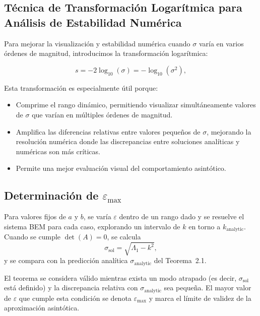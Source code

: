 \documentclass[11pt]{article}
\begin{document}
\subsection{Técnica de Transformación Logarítmica para Análisis de Estabilidad Numérica}\label{subsec:transformacion_log}

Para mejorar la visualización y estabilidad numérica cuando $\sigma$ varía en varios órdenes de magnitud, introducimos la transformación logarítmica:

\begin{equation}
s = -2 \log_{10}(\sigma) = -\log_{10}(\sigma^2),
\end{equation}

Esta transformación es especialmente útil porque:

\begin{itemize}
\item Comprime el rango dinámico, permitiendo visualizar simultáneamente valores de $\sigma$ que varían en múltiples órdenes de magnitud.

\item Amplifica las diferencias relativas entre valores pequeños de $\sigma$, mejorando la resolución numérica donde las discrepancias entre soluciones analíticas y numéricas son más críticas.

\item Permite una mejor evaluación visual del comportamiento asintótico.
\end{itemize}

\subsection{Determinación de $\varepsilon_{\max}$}\label{subsec:eps_max}

Para valores fijos de $a$ y $b$, se varía $\varepsilon$ dentro de un rango dado y se resuelve el sistema BEM para cada caso, explorando un intervalo de $k$ en torno a $k_{\text{analytic}}$. Cuando se cumple $\det(A) = 0$, se calcula
\begin{equation}
\sigma_{\text{sol}} = \sqrt{\Lambda_1 - k^2},
\end{equation}
y se compara con la predicción analítica $\sigma_{\text{analytic}}$ del Teorema~2.1.

El teorema se considera válido mientras exista un modo atrapado (es decir, $\sigma_{\text{sol}}$ está definido) y la discrepancia relativa con $\sigma_{\text{analytic}}$ sea pequeña. El mayor valor de $\varepsilon$ que cumple esta condición se denota $\varepsilon_{\max}$ y marca el límite de validez de la aproximación asintótica.
\end{document}
